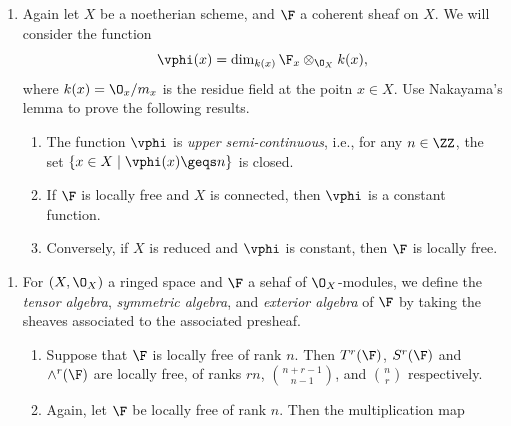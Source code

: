 \documentclass[12pt]{amsart}
\begin{document}

\begin{enumerate}
  \item[5.8.] {
      Again let $X$ be a noetherian scheme, and $\F$ a coherent sheaf on $X$.
      We will consider the function
      \[
        \vphi(x)=\dim_{k(x)}\F_x\otimes_{\O_X}k(x),
      \] 
      where $k(x)=\O_x/m_x$ is the residue field at the poitn $x\in X$.
      Use Nakayama's lemma to prove the following results.
      \begin{enumerate}
        \item The function $\vphi$ is \emph{upper semi-continuous}, i.e., for any $n\in \ZZ$, the set $\{x\in X\mid \vphi(x)\geqs n\}$ is closed.
        \item If $\F$ is locally free and $X$ is connected, then $\vphi$ is a constant function.
        \item Conversely, if $X$ is reduced and $\vphi$ is constant, then $\F$ is locally free.
      \end{enumerate}
    }
\end{enumerate}

\begin{enumerate}
  \item[5.16.] {
      For $(X,\O_X)$ a ringed space and $\F$ a sehaf of $\O_X$-modules, we define the \emph{tensor algebra}, \emph{symmetric algebra}, and \emph{exterior algebra} of $\F$ by taking the sheaves associated to the associated presheaf.
      \begin{enumerate}
        \item Suppose that $\F$ is locally free of rank $n$.
           Then $T^r(\F)$, $S^r(\F)$ and $\wedge^r(\F)$ are locally free, of ranks $rn$, $\binom{n+r-1}{n-1}$, and $\binom nr$ respectively.
         \item Again, let $\F$ be locally free of rank $n$.
           Then the multiplication map 
      \end{enumerate}
    }
\end{enumerate}
\end{document}
